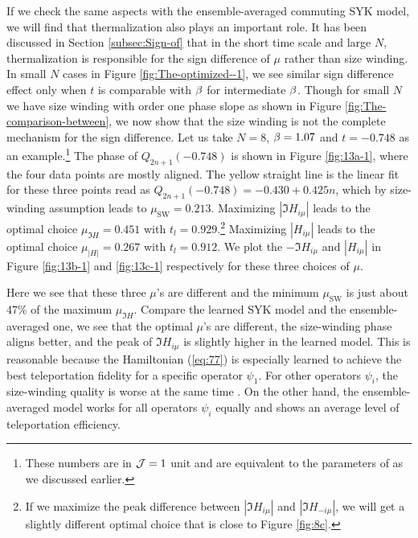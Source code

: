 \documentclass[11pt]{article}
\renewcommand{\>}{\rangle}
\newcommand{\<}{\langle}
\begin{document}
If we check the same aspects with the ensemble-averaged commuting
SYK model, we will find that thermalization also plays an important
role. It has been discussed in Section \ref{subsec:Sign-of} that
in the short time scale and large $N$, thermalization is responsible
for the sign difference of $\mu$ rather than size winding. In small
$N$ cases in Figure \ref{fig:The-optimized--1}, we see similar sign
difference effect only when $t$ is comparable with $\beta$ for intermediate
$\beta$. Though for small $N$ we have size winding with order one phase
slope as shown in Figure \ref{fig:The-comparison-between}, we now
show that the size winding is not the complete mechanism for the sign
difference. Let us take $N=8$, $\beta=1.07$ and $t=-0.748$ as an example.\footnote{These numbers are in $\mathcal{J}=1$ unit and are equivalent to the parameters
of \cite{Jafferis:2022crx}  as we discussed earlier.} The phase of $Q_{2n+1}(-0.748)$ is shown in Figure \ref{fig:13a-1},
where the four data points are mostly aligned. The yellow straight
line is the linear fit for these three points read as $Q_{2n+1}(-0.748)=-0.430+0.425n$,
which by size-winding assumption leads to $\mu_{\text{SW}}=0.213$.
Maximizing $|\Im H_{i\mu}|$ leads to the optimal choice $\mu_{\Im H}=0.451$
with $t_{l}=0.929$.\footnote{If we maximize the peak difference between $|\Im H_{i\mu}|$ and $|\Im H_{-i\mu}|$,
we will get a slightly different optimal choice that is close to Figure
\ref{fig:8c}.} Maximizing $|H_{i\mu}|$ leads to the optimal choice $\mu_{|H|}=0.267$
with $t_{l}=0.912$. We plot the $-\Im H_{i\mu}$ and $|H_{i\mu}|$
in Figure \ref{fig:13b-1} and \ref{fig:13c-1} respectively for these
three choices of $\mu$. 

Here we see that these three $\mu$'s are different and the minimum
$\mu_{\text{SW}}$ is just about 47\% of the maximum $\mu_{\Im H}$.
Compare the learned SYK model and the ensemble-averaged one, we see
that the optimal $\mu$'s are different, the size-winding phase aligns
better, and the peak of $\Im H_{i\mu}$ is slightly higher in the learned
model. This is reasonable because the Hamiltonian (\ref{eq:77}) is especially learned to achieve the best teleportation fidelity for a specific
operator $\psi_{1}$. For other operators $\psi_{i}$, the size-winding
quality is worse at the same time \cite{Jafferis:2022crx,Kobrin:2023rzr}. On the other hand, the
ensemble-averaged model works for all operators $\psi_{i}$ equally
and shows an average level of teleportation efficiency. 
\end{document}
